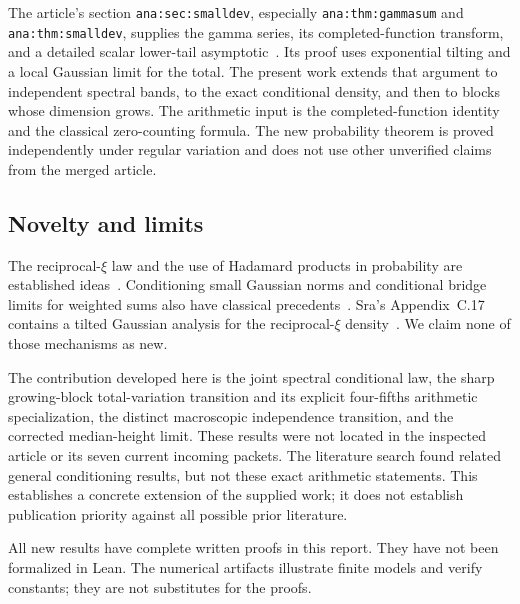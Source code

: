 The article's section \texttt{ana:sec:smalldev}, especially
\texttt{ana:thm:gammasum} and \texttt{ana:thm:smalldev}, supplies the
gamma series, its completed-function transform, and a detailed scalar
lower-tail asymptotic~\cite{ProveItArticle}. Its proof uses exponential
tilting and a local Gaussian limit for the total. The present work
extends that argument to independent spectral bands, to the exact
conditional density, and then to blocks whose dimension grows. The
arithmetic input is the completed-function identity and the classical
zero-counting formula. The new probability theorem is proved
independently under regular variation and does not use other unverified
claims from the merged article.

\subsection{Novelty and limits}

The reciprocal-$\xi$ law and the use of Hadamard products in probability
are established ideas~\cite{RoynetteYor,GaoHannigLeeTorcaso}. Conditioning
small Gaussian norms and conditional bridge limits for weighted sums
also have classical precedents~\cite{MayerWolfZeitouni,SobolevShklyaev}.
Sra's Appendix~C.17 contains a tilted Gaussian analysis for the
reciprocal-$\xi$ density~\cite{Sra}. We claim none of those mechanisms
as new.

The contribution developed here is the joint spectral conditional law,
the sharp growing-block total-variation transition and its explicit
four-fifths arithmetic specialization, the distinct macroscopic
independence transition, and the corrected median-height limit.
These results were not located in the inspected article or its seven
current incoming packets. The literature search found related general
conditioning results, but not these exact arithmetic statements. This
establishes a concrete extension of the supplied work; it does not
establish publication priority against all possible prior literature.

All new results have complete written proofs in this report. They have
not been formalized in Lean. The numerical artifacts illustrate finite
models and verify constants; they are not substitutes for the proofs.

